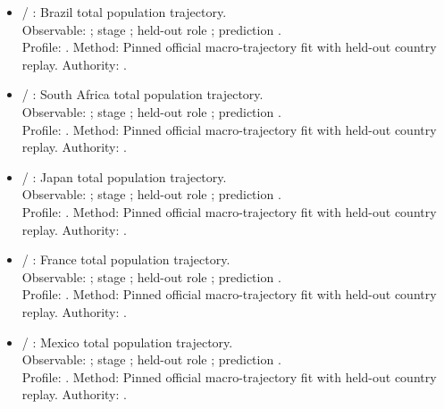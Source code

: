 \begin{itemize}
\item {} / : Brazil total population trajectory.\\ Observable: ; stage ; held-out role ; prediction .\\ Profile: . Method: Pinned official macro-trajectory fit with held-out country replay. Authority: .
\item {} / : South Africa total population trajectory.\\ Observable: ; stage ; held-out role ; prediction .\\ Profile: . Method: Pinned official macro-trajectory fit with held-out country replay. Authority: .
\item {} / : Japan total population trajectory.\\ Observable: ; stage ; held-out role ; prediction .\\ Profile: . Method: Pinned official macro-trajectory fit with held-out country replay. Authority: .
\item {} / : France total population trajectory.\\ Observable: ; stage ; held-out role ; prediction .\\ Profile: . Method: Pinned official macro-trajectory fit with held-out country replay. Authority: .
\item {} / : Mexico total population trajectory.\\ Observable: ; stage ; held-out role ; prediction .\\ Profile: . Method: Pinned official macro-trajectory fit with held-out country replay. Authority: .

\end{itemize}
